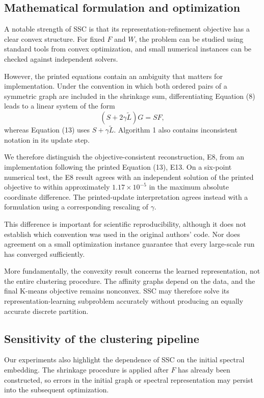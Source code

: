 \documentclass{article}
\begin{document}
\subsection{Mathematical formulation and optimization}

A notable strength of SSC is that its representation-refinement objective has a clear convex structure. For fixed \(F\) and \(W\), the problem can be studied using standard tools from convex optimization, and small numerical instances can be checked against independent solvers.

However, the printed equations contain an ambiguity that matters for implementation. Under the convention in which both ordered pairs of a symmetric graph are included in the shrinkage sum, differentiating Equation (8) leads to a linear system of the form
\[
(S+2\gamma\widetilde L)G=SF,
\]
whereas Equation (13) uses \(S+\gamma\widetilde L\). Algorithm 1 also contains inconsistent notation in its update step.

We therefore distinguish the objective-consistent reconstruction, E8, from an implementation following the printed Equation (13), E13. On a six-point numerical test, the E8 result agrees with an independent solution of the printed objective to within approximately \(1.17\times10^{-5}\) in the maximum absolute coordinate difference. The printed-update interpretation agrees instead with a formulation using a corresponding rescaling of \(\gamma\).

This difference is important for scientific reproducibility, although it does not establish which convention was used in the original authors' code. Nor does agreement on a small optimization instance guarantee that every large-scale run has converged sufficiently.

More fundamentally, the convexity result concerns the learned representation, not the entire clustering procedure. The affinity graphs depend on the data, and the final K-means objective remains nonconvex. SSC may therefore solve its representation-learning subproblem accurately without producing an equally accurate discrete partition.

\subsection{Sensitivity of the clustering pipeline}

Our experiments also highlight the dependence of SSC on the initial spectral embedding. The shrinkage procedure is applied after \(F\) has already been constructed, so errors in the initial graph or spectral representation may persist into the subsequent optimization.
\end{document}
